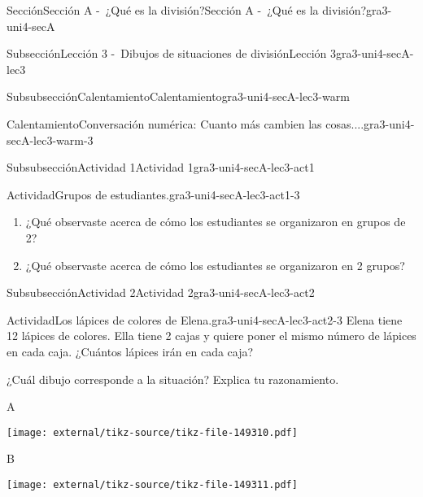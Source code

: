 \documentclass[twoside,10pt,]{article}
\begin{document}
\begin{sectionptx}{Sección}{Sección A -~¿Qué es la división?}{}{Sección A -~¿Qué es la división?}{}{}{gra3-uni4-secA}
\begin{subsectionptx}{Subsección}{Lección 3 -~Dibujos de situaciones de división}{}{Lección 3}{}{}{gra3-uni4-secA-lec3}
\begin{subsubsectionptx}{Subsubsección}{Calentamiento}{}{Calentamiento}{}{}{gra3-uni4-secA-lec3-warm}
\begin{exploration}{Calentamiento}{Conversación numérica: Cuanto más cambien las cosas....}{gra3-uni4-secA-lec3-warm-3}
\begin{itemize}[label=\textbullet]
\end{itemize}
%
\end{exploration}%
\end{subsubsectionptx}
%
%
\typeout{************************************************}
\typeout{************************************************}
%
\begin{subsubsectionptx}{Subsubsección}{Actividad 1}{}{Actividad 1}{}{}{gra3-uni4-secA-lec3-act1}
\begin{activity}{Actividad}{Grupos de estudiantes.}{gra3-uni4-secA-lec3-act1-3}%
%
\begin{enumerate}
\item{}¿Qué observaste acerca de cómo los estudiantes se organizaron en grupos de 2?%
\item{}¿Qué observaste acerca de cómo los estudiantes se organizaron en 2 grupos?%
\end{enumerate}
%
\end{activity}%
\end{subsubsectionptx}
%
%
\typeout{************************************************}
\typeout{************************************************}
%
\begin{subsubsectionptx}{Subsubsección}{Actividad 2}{}{Actividad 2}{}{}{gra3-uni4-secA-lec3-act2}
\begin{activity}{Actividad}{Los lápices de colores de Elena.}{gra3-uni4-secA-lec3-act2-3}%
Elena tiene 12 lápices de colores. Ella tiene 2 cajas y quiere poner el mismo número de lápices en cada caja. ¿Cuántos lápices irán en cada caja?%
\par
¿Cuál dibujo corresponde a la situación? Explica tu razonamiento.%
\begin{sidebyside}{2}{0}{0}{0}%
\begin{sbspanel}{0.5}%
A%
\par
\texttt{[image: external/tikz-source/tikz-file-149310.pdf]}
\end{sbspanel}%
\begin{sbspanel}{0.5}%
B%
\par
\texttt{[image: external/tikz-source/tikz-file-149311.pdf]}
\end{sbspanel}%
\end{sidebyside}%
\end{activity}%
\end{subsubsectionptx}
%
%
\typeout{************************************************}

\end{subsectionptx}
\end{sectionptx}
\end{document}
